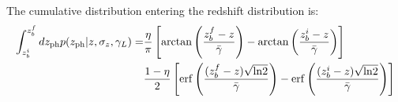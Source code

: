 \documentclass[prd,twocolumn]{revtex4}
\begin{document}
\begin{widetext}
    The cumulative distribution entering the redshift distribution is:
    \begin{align}\nonumber
      \int_{z_b^i}^{z_b^f}dz_{\rm ph}p(z_{\rm ph}|z,\sigma_z,\gamma_L)=
      &\frac{\eta}{\pi}\left[{\rm arctan}\left(\frac{z_b^f-z}{\bar{\gamma}}\right)-{\rm arctan}\left(\frac{z_b^i-z}{\bar{\gamma}}\right)\right]\\
      &\frac{1-\eta}{2}\left[{\rm erf}\left(\frac{(z_b^f-z)\sqrt{{\rm ln}2}}{\bar{\gamma}}\right)-{\rm erf}\left(\frac{(z_b^i-z)\sqrt{{\rm ln}2}}{\bar{\gamma}}\right)\right]
    \end{align}


\end{widetext}
\end{document}
